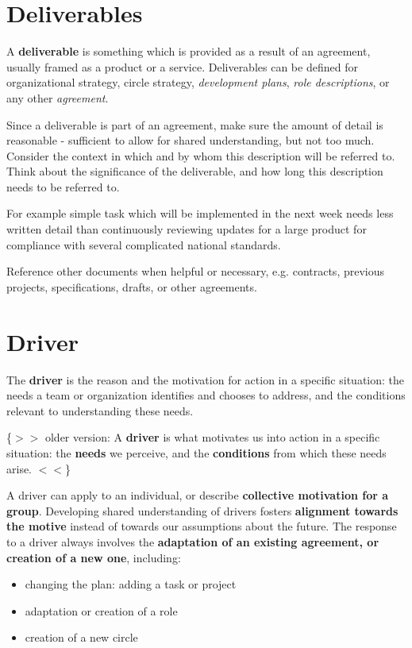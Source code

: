 \section{Deliverables}
\label{deliverables}

A \textbf{deliverable} is something which is provided as a result of an agreement, usually framed as a product or a service. Deliverables can be defined for organizational strategy, circle strategy, \emph{development plans}, \emph{role descriptions}, or any other \emph{agreement}.

Since a deliverable is part of an agreement, make sure the amount of detail is reasonable - sufficient to allow for shared understanding, but not too much. Consider the context in which and by whom this description will be referred to. Think about the significance of the deliverable, and how long this description needs to be referred to.

For example simple task which will be implemented in the next week needs less written detail than continuously reviewing updates for a large product for compliance with several complicated national standards.

Reference other documents when helpful or necessary, e.g. contracts, previous projects, specifications, drafts, or other agreements.

\section{Driver}
\label{driver}

The \textbf{driver} is the reason and the motivation for action in a specific situation: the needs a team or organization identifies and chooses to address, and the conditions relevant to understanding these needs.

\{$>$$>$ older version: A \textbf{driver} is what motivates us into action in a specific situation: the \textbf{needs} we perceive, and the \textbf{conditions} from which these needs arise. $<$$<$\}

A driver can apply to an individual, or describe \textbf{collective motivation for a group}. Developing shared understanding of drivers fosters \textbf{alignment towards the motive} instead of towards our assumptions about the future. The response to a driver always involves the \textbf{adaptation of an existing agreement, or creation of a new one}, including:

\begin{itemize}
\item changing the plan: adding a task or project

\item adaptation or creation of a role

\item creation of a new circle

\end{itemize}


